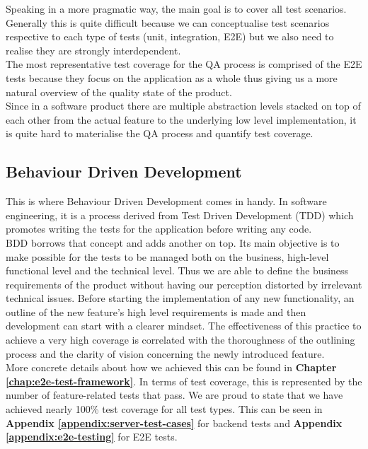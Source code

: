 Speaking in a more pragmatic way, the main goal is to cover all test scenarios. Generally this is quite difficult because we can conceptualise test scenarios respective to each type of tests (unit, integration, E2E) but we also need to realise they are strongly interdependent.
\\

The most representative test coverage for the QA process is comprised of the E2E tests because they focus on the application as a whole thus giving us a more natural overview of the quality state of the product.
\\

Since in a software product there are multiple abstraction levels stacked on top of each other from the actual feature to the underlying low level implementation, it is quite hard to materialise the QA process and quantify test coverage.

\subsection{Behaviour Driven Development}
\label{subsubsec:bdd}

This is where Behaviour Driven Development comes in handy. In software engineering, it is a process derived from Test Driven Development (TDD) which promotes writing the tests for the application before writing any code.
\\

BDD borrows that concept and adds another on top. Its main objective is to make possible for the tests to be managed both on the business, high-level functional level and the technical level. Thus we are able to define the business requirements of the product without having our perception distorted by irrelevant technical issues. Before starting the implementation of any new functionality, an outline of the new feature's high level requirements is made and then development can start with a clearer mindset. The effectiveness of this practice to achieve a very high coverage is correlated with the thoroughness of the outlining process and the clarity of vision concerning the newly introduced feature.
\\

More concrete details about how we achieved this can be found in \textbf{Chapter \ref{chap:e2e-test-framework}}. In terms of test coverage, this is represented by the number of feature-related tests that pass. We are proud to state that we have achieved nearly 100\% test coverage for all test types. This can be seen in \textbf{Appendix \ref{appendix:server-test-cases}} for backend tests and \textbf{Appendix \ref{appendix:e2e-testing}} for E2E tests.

